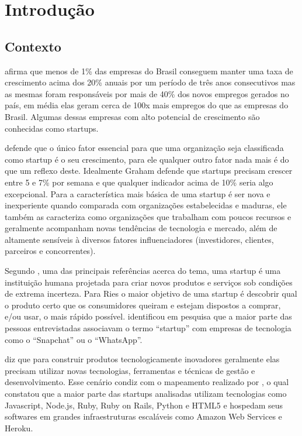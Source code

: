 \chapter{Introdução}
\label{cap-introducao}

\section{Contexto}
\label{section:contexto}

 afirma que menos de 1\% das empresas do Brasil conseguem manter uma taxa de crescimento acima dos 20\% anuais por um período de três anos consecutivos mas as mesmas foram responsáveis por mais de 40\% dos novos empregos gerados no país, em média elas geram cerca de 100x mais empregos do que as empresas do Brasil. Algumas dessas empresas com alto potencial de crescimento são conhecidas como startups.

 defende que o único fator essencial para que uma organização seja classificada como startup é o seu crescimento, para ele qualquer outro fator nada mais é do que um reflexo deste. Idealmente Graham defende que startups precisam crescer entre 5 e 7\% por semana e que qualquer indicador acima de 10\% seria algo excepcional. Para  a característica mais básica de uma startup é ser nova e inexperiente quando comparada com organizações estabelecidas e maduras, ele também as caracteriza como organizações que trabalham com poucos recursos e geralmente acompanham novas tendências de tecnologia e mercado, além de altamente sensíveis à diversos fatores influenciadores (investidores, clientes, parceiros e concorrentes).

Segundo , uma das principais referências acerca do tema, uma startup é uma instituição humana projetada para criar novos produtos e serviços sob condições de extrema incerteza. Para Ries o maior objetivo de uma startup é descobrir qual o produto certo que os consumidores queiram e estejam dispostos a comprar, e/ou usar, o mais rápido possível.  identificou em pesquisa que a maior parte das pessoas entrevistadas associavam o termo ``startup'' com empresas de tecnologia como o ``Snapchat'' ou o ``WhatsApp''.

 diz que para construir produtos tecnologicamente inovadores geralmente elas precisam utilizar novas tecnologias, ferramentas e técnicas de gestão e desenvolvimento. Esse cenário condiz com o mapeamento realizado por , o qual constatou que a maior parte das startups analisadas utilizam tecnologias como Javascript, Node.js, Ruby, Ruby on Rails, Python e HTML5 e hospedam seus softwares em grandes infraestruturas escaláveis como Amazon Web Services e Heroku. 


